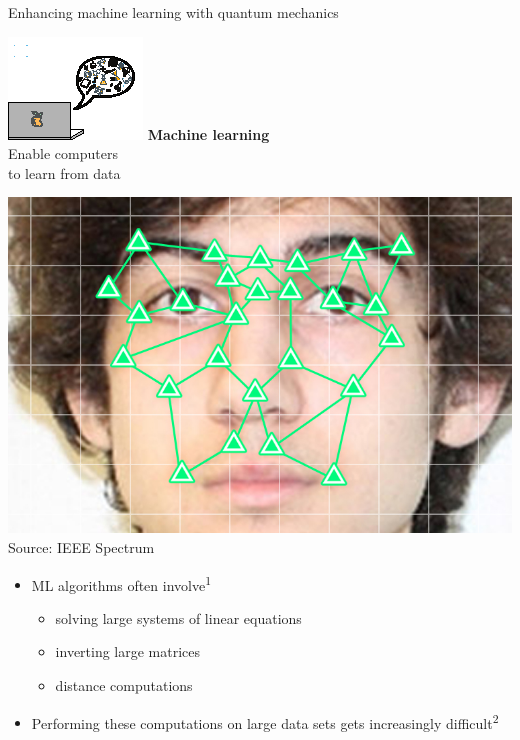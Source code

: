 \documentclass[10pt]{beamer}
\begin{document}
{
\begin{frame}[fragile]{Enhancing machine learning with quantum mechanics}

\begin{minipage}[c]{0.45\textwidth}
\includegraphics[scale=3.5]{Vectors/laptop_ml.eps}
\newline
\textbf{Machine learning}\\
Enable computers\\
to learn from data
\end{minipage}%
\hspace{0.5cm}
\begin{minipage}[c]{0.49\textwidth}
\centering
\includegraphics[scale=0.8]{facial_recognition.jpg}\\
\vspace{-0.2cm}
\tiny{Source: IEEE Spectrum}
\normalsize
\vspace{0.5cm}
\flushleft
\begin{itemize}	 
	\item ML algorithms often involve\textsuperscript{1}
	\begin{itemize}
	\item solving large systems of linear equations
	\item inverting large matrices
	\item distance computations
	\end{itemize}
	\item Performing these computations on large data
sets gets increasingly difficult\textsuperscript{2}
\end{itemize}
\end{minipage}



\end{frame}}
\end{document}

